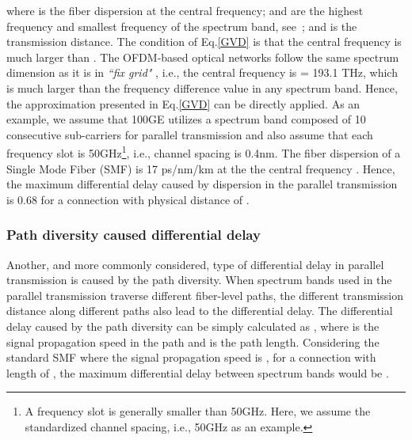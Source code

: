 \documentclass[conference]{IEEEtran}
\begin{document}
where  is the fiber dispersion at the central frequency;  and  are the highest frequency and smallest frequency of the spectrum band, see~\cite{Sun:2008}; and  is the transmission distance.
The condition of Eq.\eqref{GVD} is that the central frequency is much larger than . The OFDM-based optical networks follow the same spectrum dimension as it is in  \emph{``fix grid"} \cite{Jinno:2009}, i.e., the central frequency is  = 193.1 THz, which is much larger than the frequency difference value   in any spectrum band. Hence, the approximation presented in Eq.\eqref{GVD} can be directly applied. As an example,  we assume that 100GE utilizes a spectrum band composed of 10 consecutive sub-carriers for parallel transmission and also assume that each frequency slot is 50GHz\footnote{A frequency slot is generally smaller than 50GHz. Here, we assume the standardized channel spacing, i.e., 50GHz as an example. }, i.e., channel spacing is 
0.4nm. The fiber dispersion of a Single Mode Fiber (SMF) is 17 ps/nm/km at the the central frequency \cite{Sun:2008}. Hence, the maximum differential delay caused by dispersion in the parallel transmission is   0.68  for a connection with physical distance of . 

\subsubsection{Path diversity caused differential delay} 
Another, and more commonly considered, type of differential delay in parallel transmission is caused by the path diversity. When spectrum bands used in the parallel transmission traverse different fiber-level paths,  the different transmission distance along different paths also lead to the differential delay. The differential delay caused by the path diversity can be simply calculated as , where  is the signal propagation speed in the path and  is the path length. Considering the standard SMF where the signal propagation  speed is , for a  connection with length of ,  the  maximum differential delay between spectrum bands would be . 
    
   
\end{document}
